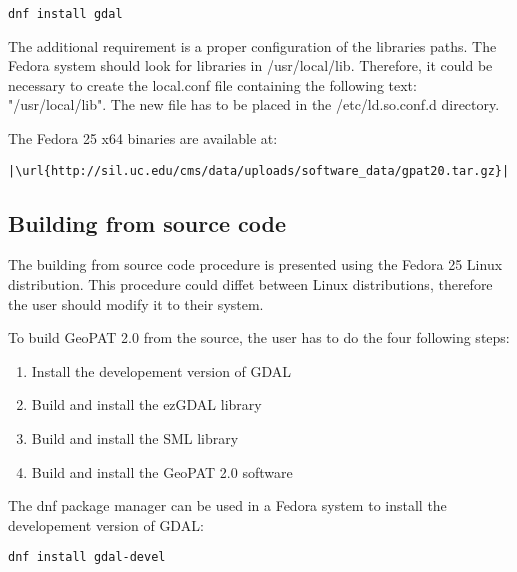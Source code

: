 \begin{lstlisting}
dnf install gdal
\end{lstlisting}

The additional requirement is a proper configuration of the libraries paths.
The Fedora system should look for libraries in /usr/local/lib.
Therefore, it could be necessary to create the local.conf file containing the following text: "/usr/local/lib".
The new file has to be placed in the /etc/ld.so.conf.d directory.

The Fedora 25 x64 binaries are available at:

\begin{lstlisting}[escapechar=|]
|\url{http://sil.uc.edu/cms/data/uploads/software_data/gpat20.tar.gz}|
\end{lstlisting}

\subsection{Building from source code}

The building from source code procedure is presented using the Fedora 25 Linux distribution.
This procedure could diffet between Linux distributions, therefore the user should modify it to their system.

To build GeoPAT 2.0 from the source, the user has to do the four following steps:

\begin{enumerate}
    \item{Install the developement version of GDAL}
    \item{Build and install the ezGDAL library}
    \item{Build and install the SML library}
    \item{Build and install the GeoPAT 2.0 software}
\end{enumerate}

The dnf package manager can be used in a Fedora system to install the developement version of GDAL:

\begin{lstlisting}
dnf install gdal-devel
\end{lstlisting}

